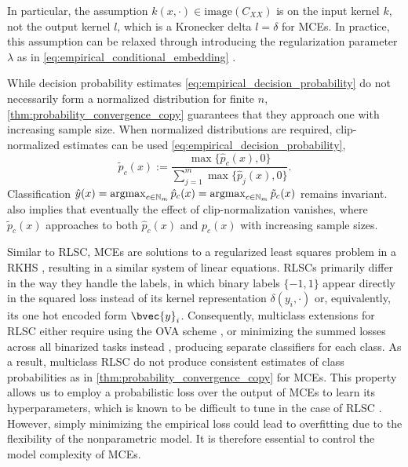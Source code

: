 \documentclass[twoside]{article}
\newcommand{\argmax}{\operatornamewithlimits{argmax}}
\begin{document}
		In particular, the assumption $k(x, \cdot) \in \mathrm{image}(C_{XX})$ is on the input kernel $k$, not the output kernel $l$, which is a Kronecker delta $l = \delta$ for \glspl{MCE}. In practice, this assumption can be relaxed through introducing the regularization parameter $\lambda$ as in \eqref{eq:empirical_conditional_embedding} \citep{song2009hilbert}.

		While decision probability estimates \eqref{eq:empirical_decision_probability} do not necessarily form a normalized distribution for finite $n$, \cref{thm:probability_convergence_copy} guarantees that they approach one with increasing sample size. When normalized distributions are required, clip-normalized estimates can be used \eqref{eq:empirical_decision_probability},
		\begin{equation}
		\tilde{p}_{c}(x) := \frac{\max\{\hat{p}_{c}(x), 0\}}{\sum_{j = 1}^{m} \max\{\hat{p}_{j}(x), 0\}}.
		\label{eq:empirical_decision_probability_clip_normalized}
		\end{equation}
		Classification $\hat{y}(x) = \argmax_{c \in \mathbb{N}_{m}} \hat{p}_{c}(x) = \argmax_{c \in \mathbb{N}_{m}} \tilde{p}_{c}(x)$ remains invariant.   also implies that eventually the effect of clip-normalization vanishes, where $\tilde{p}_{c}(x)$ approaches to both $\hat{p}_{c}(x)$ and $p_{c}(x)$ with increasing sample sizes.
	
		Similar to \gls{RLSC}, \glspl{MCE} are solutions to a regularized least squares problem in a \gls{RKHS} \citep{lever2012conditional}, resulting in a similar system of linear equations. \glspl{RLSC} primarily differ in the way they handle the labels, in which binary labels $\{-1, 1\}$ appear directly in the squared loss instead of its kernel representation $\delta(y_{i}, \cdot)$ or, equivalently, its one hot encoded form $\bvec{y}_{i}$. Consequently, multiclass extensions for \gls{RLSC} either require using the \gls{OVA} scheme \citep{rifkin2003regularized}, or minimizing the summed losses across all binarized tasks instead \citep{pahikkala2012unsupervised}, producing separate classifiers for each class. As a result, multiclass \gls{RLSC} do not produce consistent estimates of class probabilities as in \cref{thm:probability_convergence_copy} for \glspl{MCE}. This property allows us to employ a probabilistic loss over the output of \glspl{MCE} to learn its hyperparameters, which is known to be difficult to tune in the case of \gls{RLSC} \citep{pahikkala2012unsupervised}. However, simply minimizing the empirical loss could lead to overfitting due to the flexibility of the nonparametric model. It is therefore essential to control the model complexity of \glspl{MCE}.
				
\end{document}
